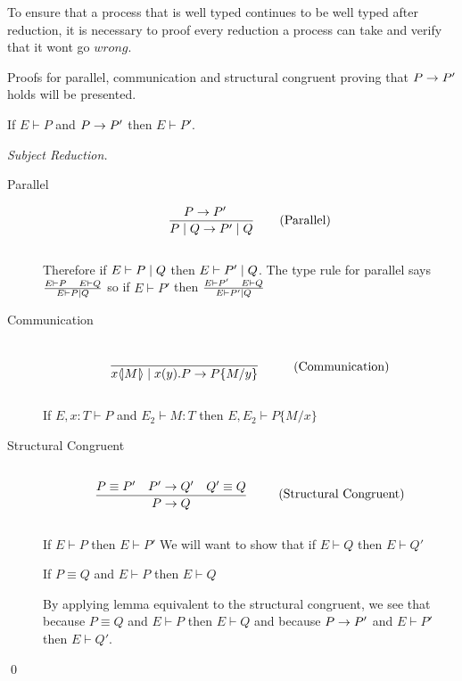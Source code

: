     To ensure that a process that is well typed continues to be well typed after reduction, it is necessary to proof every reduction a process can take and verify that it wont go $wrong$.

    Proofs for parallel, communication and structural congruent proving that $P \rightarrow P'$ holds will be presented.\\
\begin{theorem}
    If $E \vdash P$ and $P\rightarrow P'$ then $E \vdash P'$.
\end{theorem}
\begin{proof}[Subject Reduction]
	\begin{description}
		\item[Parallel]
		\begin{align*}
		\frac{P \rightarrow P' \quad}{P \mid Q \rightarrow P' \mid Q} \tag{Parallel}
		\end{align*}\\
		
		Therefore if $E \vdash P \mid Q$ then $E \vdash P' \mid Q$. The type rule for parallel says $\frac{E \vdash P\quad E \vdash Q}{E \vdash P \mid Q}$ so if $E \vdash P'$ then $\frac{E \vdash P' \quad E \vdash Q}{E \vdash P' \mid Q}$\\
		\item[Communication]
		\begin{align*}
		\infrule{}{\lift{x}{M}\para\inp{x}{y}P\ra P\{M/y\}} \tag{Communication}
		\end{align*}
		
		\begin{lemma}[Substitution]
			If $E,x:T \vdash P$ and $E_2 \vdash M:T$ then $E, E_2 \vdash P\{M/x \}$
		\end{lemma}
		\item[Structural Congruent]
		\begin{align*}
		\infrule{P \equiv P' \quad P' \ra Q' \quad Q' \equiv Q}{P \ra Q} \tag{Structural Congruent}
		\end{align*}
		
		
		If $E \vdash P$ then $E \vdash P'$ We will want to show that if $E \vdash Q$ then $E \vdash Q'$
		
		\begin{lemma}[Equivalent]
			If $P \equiv Q$ and $E \vdash P$ then $E \vdash Q$
		\end{lemma}
		
		By applying lemma equivalent to the structural congruent, we see that because $P \equiv Q$ and $E \vdash P$ then $E \vdash Q$ and because $P \rightarrow P'$ and $E \vdash P'$ then $E \vdash Q'$.
	\end{description}
	\qed
\end{proof}
\newpage

